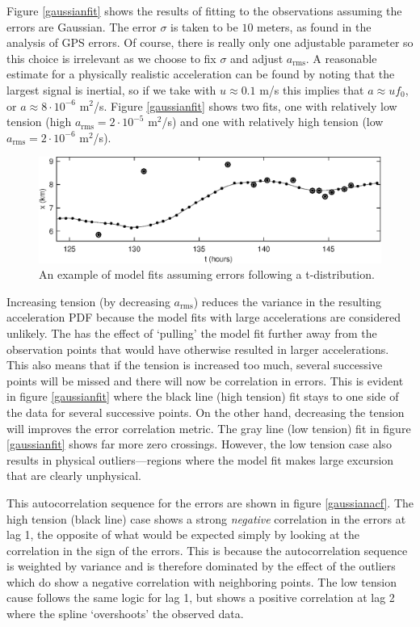 \documentclass[twocol]{ametsoc}
\begin{document}
Figure \ref{gaussianfit} shows the results of fitting to the observations assuming the errors are Gaussian. The error $\sigma$ is taken to be $10$ meters, as found in the analysis of GPS errors. Of course, there is really only one adjustable parameter so this choice is  irrelevant as we choose to fix $\sigma$ and adjust $a_{\textrm{rms}}$.  A reasonable estimate for a physically realistic acceleration can be found by noting that the largest signal is inertial, so if we take with $u \approx 0.1$ m/s this implies  that $a \approx u f_0$, or $a \approx 8 \cdot 10^{-6}$ m$^2$/s. Figure \ref{gaussianfit} shows two fits, one with relatively low tension (high $a_{\textrm{rms}}=2 \cdot 10^{-5}$ m$^2$/s) and one with relatively high tension (low $a_{\textrm{rms}}=2 \cdot 10^{-6}$ m$^2$/s).
\begin{figure}[t]
  \centerline{\includegraphics[width=39pc,angle=0]{tdistributionfit}}
  
  \caption{An example of model fits assuming errors following a t-distribution.}
  \label{tdistributionfit}
\end{figure}

Increasing tension (by decreasing $a_{\textrm{rms}}$) reduces the variance in the resulting acceleration PDF because the model fits with large accelerations are considered unlikely. The has the effect of `pulling' the model fit further away from the observation points that would have otherwise resulted in larger accelerations. This also means that if the tension is increased too much, several successive points will be missed and there will now be correlation in errors. This is evident in figure \ref{gaussianfit} where the black line (high tension) fit stays to one side of the data for several successive points. On the other hand, decreasing the tension will improves the error correlation metric. The gray line (low tension) fit in figure \ref{gaussianfit} shows far more zero crossings. However, the low tension case also results in physical outliers---regions where the model fit makes large excursion that are clearly unphysical.

This autocorrelation sequence for the errors are shown in figure \ref{gaussianacf}. The high tension (black line) case shows a strong \emph{negative} correlation in the errors at lag 1, the opposite of what would be expected simply by looking at the correlation in the sign of the errors. This is because the autocorrelation sequence is weighted by variance and is therefore dominated by the effect of the outliers which do show a negative correlation with neighboring points. The low tension cause follows the same logic for lag 1, but shows a positive correlation at lag 2 where the spline `overshoots' the observed data.
\end{document}
